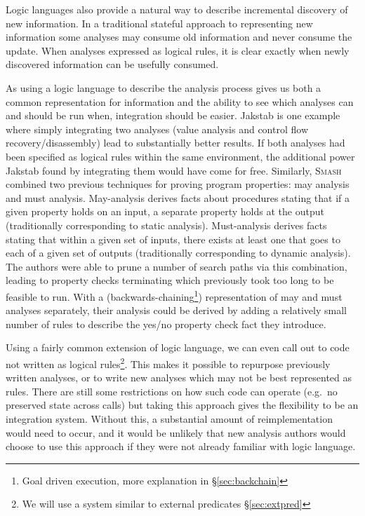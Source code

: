 Logic languages also provide a natural way to describe incremental discovery of new information.
In a traditional stateful approach to representing new information some analyses may consume old information and never consume the update.
When analyses expressed as logical rules, it is clear exactly when newly discovered information can be usefully consumed.

As using a logic language to describe the analysis process gives us both a common representation for information and the ability to see which analyses can and should be run when, integration should be easier.
Jakstab\cite{jakstab} is one example where simply integrating two analyses (value analysis and control flow recovery/disassembly) lead to substantially better results.
If both analyses had been specified as logical rules within the same environment, the additional power Jakstab found by integrating them would have come for free.
Similarly, \textsc{Smash}\cite{maymust} combined two previous techniques for proving program properties: may analysis and must analysis.
May-analysis derives facts about procedures stating that if a given property holds on an input, a separate property holds at the output (traditionally corresponding to static analysis).
Must-analysis derives facts stating that within a given set of inputs, there exists at least one that goes to each of a given set of outputs (traditionally corresponding to dynamic analysis).
The authors were able to prune a number of search paths via this combination, leading to property checks terminating which previously took too long to be feasible to run.
With a (backwards-chaining\footnote{Goal driven execution, more explanation in \S\ref{sec:backchain}}) representation of may and must analyses separately, their analysis could be derived by adding a relatively small number of rules to describe the yes/no property check fact they introduce.


Using a fairly common extension of logic language, we can even call out to code not written as logical rules\footnote{We will use a system similar to external predicates \S\ref{sec:extpred}}.
This makes it possible to repurpose previously written analyses, or to write new analyses which may not be best represented as rules.
There are still some restrictions on how such code can operate (e.g.\ no preserved state across calls) but taking this approach gives the flexibility to be an integration system.
Without this, a substantial amount of reimplementation would need to occur, and it would be unlikely that new analysis authors would choose to use this approach if they were not already familiar with logic language.

